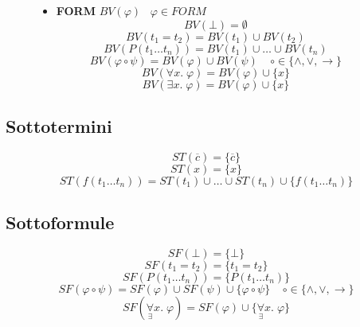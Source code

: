 \documentclass{article}
\theoremstyle{break}
\theoremstyle{break}
\theoremstyle{break}
\theoremstyle{break}
\begin{document}
\begin{figure}[H]
  \begin{definition}
    \begin{itemize}
      \item \textbf{FORM} \( BV(\varphi)\;\;\;\varphi \in FORM \) 
        \[
        BV(\bot) = \emptyset
        \] 
        \[
        BV(t_1 = t_2) = BV(t_1) \cup BV(t_2) 
        \] 
        \[
        BV(P(t_1 \ldots t_n)) = BV(t_1) \cup  \ldots  \cup  BV(t_n)
        \] 
        \[
        BV(\varphi \circ \psi) = BV(\varphi) \cup BV(\psi) \;\;\;\; \circ \in \{\wedge, \vee, \to \} 
        \] 
        \[
        BV(\forall x.\; \varphi) = BV(\varphi) \cup \{x\} 
        \] 
        \[
        BV(\exists x.\; \varphi) = BV(\varphi) \cup \{x\} 
        \] 
    \end{itemize} 
  \end{definition}
\end{figure}


\subsection{Sottotermini}
\[
  ST(\overline{c}) = \{\overline{c}\} 
\] 
\[
  ST(x) = \{x\} 
\] 
\[
  ST(f(t_1 \ldots t_n)) = ST(t_1) \cup \ldots \cup ST(t_n) \cup \{f(t_1 \ldots t_n)\} 
\] 
\subsection{Sottoformule}
\[
SF(\bot) = \{\bot\} 
\] 
\[
SF(t_1 = t_2) = \{t_1 = t_2\} 
\] 
\[
SF(P(t_1 \ldots t_n)) = \{P(t_1 \ldots t_n)\} 
\] 
\[
SF(\varphi \circ \psi) = SF(\varphi) \cup SF(\psi) \cup \{\varphi \circ \psi\}\;\;\;\; \circ \in \{\wedge, \vee, \to \}  
\] 
\[
  SF(\underset{\exists}{\forall}x.\; \varphi) = SF(\varphi) \cup \{\underset{\exists}{\forall}x.\; \varphi\}
\] 
\end{document}
